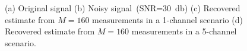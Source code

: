 \documentclass{article}
\theoremstyle{definition}
\begin{document}
\begin{figure}[htb]
	\hfill%
	\hfill%
	\caption{(a) Original signal (b) Noisy signal~(SNR=\SI{30}{\decibel}) (c) Recovered estimate from $M=160$ measurements in a \num{1}-channel scenario (d) Recovered estimate from $M=160$ measurements in a \num{5}-channel scenario.}
	\label{fig_synth_noisy}
\end{figure}
\end{document}
